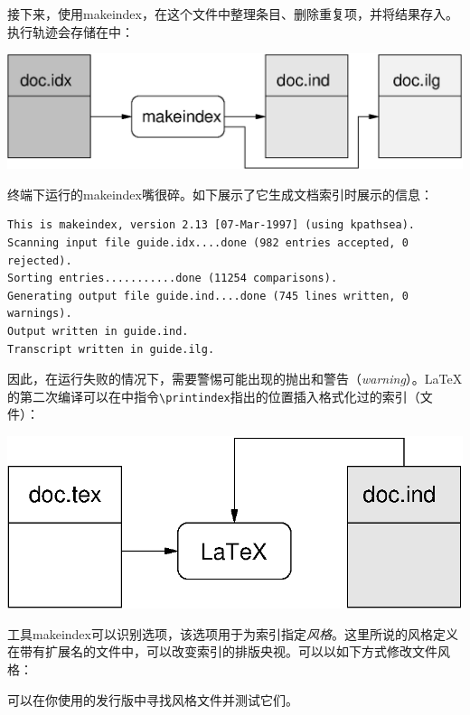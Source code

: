 接下来，使用\textsf{makeindex}，在这个文件中整理条目、删除重复项，并将结果存入。执行轨迹会存储在中：

\begin{center}
    \includegraphics{img/makeindex2}
\end{center}

终端下运行的\textsf{makeindex}嘴很碎。如下展示了它生成文档索引时展示的信息：

\begin{dmd}
\begin{verbatim}
This is makeindex, version 2.13 [07-Mar-1997] (using kpathsea).
Scanning input file guide.idx....done (982 entries accepted, 0 rejected).
Sorting entries...........done (11254 comparisons).
Generating output file guide.ind....done (745 lines written, 0 warnings).
Output written in guide.ind.
Transcript written in guide.ilg.\end{verbatim}
\end{dmd}

因此，在运行失败的情况下，需要警惕可能出现的抛出和警告（\emph{warning}）。\LaTeX 的第二次编译可以在中指令\verb|\printindex|指出的位置插入格式化过的索引（文件）：

\begin{center}
    \includegraphics{img/makeindex3}
\end{center}

\begin{ii}
工具makeindex可以识别选项，该选项用于为索引指定\emph{风格}。这里所说的风格定义在带有扩展名的文件中，可以改变索引的排版央视。可以以如下方式修改文件风格：


可以在你使用的发行版中寻找风格文件并测试它们。
\end{ii}


